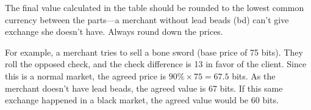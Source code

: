 
The final value calculated in the table should be rounded to the lowest common currency between the parts---a merchant without lead beads (bd) can't give exchange she doesn't have. Always round down the prices.

For example, a merchant tries to sell a bone sword (base price of 75 bits). They roll the opposed check, and the check difference is 13 in favor of the client. Since this is a normal market, the agreed price is $90\% \times 75 = 67.5$ bits. As the merchant doesn't have lead beads, the agreed value is 67 bits. If this same exchange happened in a black market, the agreed value would be 60 bits.




